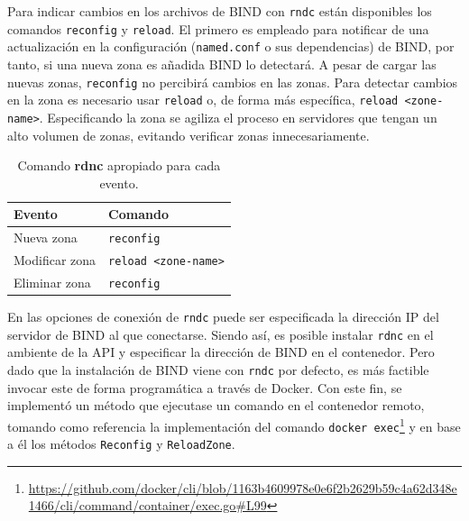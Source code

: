 Para indicar cambios en los archivos de BIND con \verb|rndc| están disponibles los comandos \verb|reconfig| y \verb|reload|. El primero es empleado para notificar de una actualización en la configuración (\verb|named.conf| o sus dependencias) de BIND, por tanto, si una nueva zona es añadida BIND lo detectará. A pesar de cargar las nuevas zonas, \verb|reconfig| no percibirá cambios en las zonas. Para detectar cambios en la zona es necesario usar \verb|reload| o, de forma más específica, \verb|reload <zone-name>|. Especificando la zona se agiliza el proceso en servidores que tengan un alto volumen de zonas, evitando verificar zonas innecesariamente.

\begin{table}[!ht]
    \centering
    \begin{tabular}{|l|l|}
    \hline
        \textbf{Evento} & \textbf{Comando} \\ \hline
        Nueva zona & \verb|reconfig| \\ \hline
        Modificar zona & \verb|reload <zone-name>| \\ \hline
        Eliminar zona & \verb|reconfig| \\ \hline
    \end{tabular}
    \caption{Comando \textbf{rdnc} apropiado para cada evento.}
    \label{table:rndc-event}
\end{table}

En las opciones de conexión de \verb|rndc| puede ser especificada la dirección IP del servidor de BIND al que conectarse. Siendo así, es posible instalar \verb|rdnc| en el ambiente de la API y especificar la dirección de BIND en el contenedor. Pero dado que la instalación de BIND viene con \verb|rndc| por defecto, es más factible invocar este de forma programática a través de Docker. Con este fin, se implementó un método que ejecutase un comando en el contenedor remoto, tomando como referencia la implementación del comando \verb|docker exec|\footnote{\url{https://github.com/docker/cli/blob/1163b4609978e0e6f2b2629b59c4a62d348e1466/cli/command/container/exec.go\#L99}} y en base a él los métodos \verb|Reconfig| y \verb|ReloadZone|.

